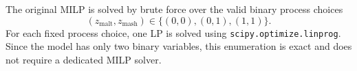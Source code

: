 The original MILP is solved by brute force over the valid binary process choices
\begin{equation}
  (z_{\mathrm{malt}},z_{\mathrm{mash}})
  \in\{(0,0),(0,1),(1,1)\}.
  \label{eq:bruteforce-set}
\end{equation}
For each fixed process choice, one LP is solved using \texttt{scipy.optimize.linprog}. Since the model has only two binary variables, this enumeration is exact and does not require a dedicated MILP solver.
